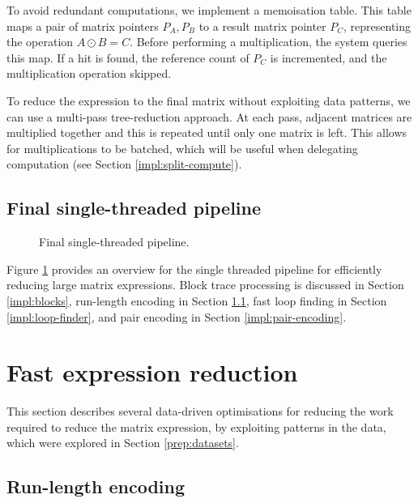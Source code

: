 To avoid redundant computations, we implement a memoisation table. This table maps a pair of matrix pointers $P_A, P_B$
to a result matrix pointer $P_C$, representing the operation $A\odot B = C$. Before performing a multiplication, the 
system queries this map. If a hit is found, the reference count of $P_C$ is incremented, and the multiplication operation 
skipped.

To reduce the expression to the final matrix without exploiting data patterns, we can use a multi-pass tree-reduction
approach. At each pass, adjacent matrices are multiplied together and this is repeated until only one matrix is left.
This allows for multiplications to be batched, which will be useful when delegating computation
(see Section \ref{impl:split-compute}).

\subsection{Final single-threaded pipeline}

\begin{figure}[H] 
\centering 



\caption{Final single-threaded pipeline.}
\label{fig:single-threaded-pipeline}
\end{figure}

Figure \ref{fig:single-threaded-pipeline} provides an overview for the 
single threaded pipeline for efficiently reducing large matrix expressions.
Block trace processing is discussed in Section \ref{impl:blocks},
run-length encoding in Section \ref{impl:rle}, fast loop finding in Section \ref{impl:loop-finder},
and pair encoding in Section \ref{impl:pair-encoding}.

\FloatBarrier
\section{Fast expression reduction} \label{impl:fast-expr}

This section describes several data-driven optimisations for reducing the work required to reduce the matrix expression,
by exploiting patterns in the data, which were explored in Section \ref{prep:datasets}.

\subsection{Run-length encoding} \label{impl:rle}

